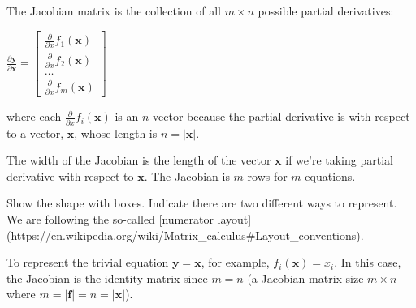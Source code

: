 \documentclass[11pt]{article}
\begin{document}
The Jacobian matrix is the collection of all $m \times n$ possible partial derivatives:

$
\frac{\partial \mathbf{y}}{\partial \mathbf{x}} = \begin{bmatrix}
\frac{\partial}{\partial {x}} f_1(\mathbf{x}) \\
\frac{\partial}{\partial {x}} f_2(\mathbf{x})\\
\ldots\\
\frac{\partial}{\partial {x}} f_m(\mathbf{x})
\end{bmatrix}
$

where each $\frac{\partial}{\partial {x}} f_i(\mathbf{x})$ is an $n$-vector because the partial derivative is with respect to a vector, $\mathbf{x}$, whose length is $n = |\mathbf{x}|$.

The width of the Jacobian is the length of the vector $\mathbf{x}$ if we're taking partial derivative with respect to $\mathbf{x}$.  The Jacobian is $m$ rows for $m$ equations.

Show the shape with boxes.  Indicate there are two different ways to represent. We are following the so-called [numerator layout](https://en.wikipedia.org/wiki/Matrix\_calculus\#Layout\_conventions).

To represent the trivial equation $\mathbf{y} = \mathbf{x}$, for example, $f_i(\mathbf{x}) = x_i$. In this case, the Jacobian is the identity matrix since $m=n$ (a Jacobian matrix size $m \times n$ where $m = |\mathbf{f}| = n = |\mathbf{x}|$).
\end{document}

